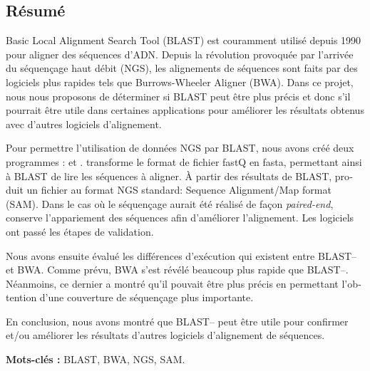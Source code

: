 \begin{otherlanguage}{french}
\chapter*{Résumé}

Basic Local Alignment Search Tool (BLAST) est couramment utilisé depuis 1990 pour aligner des séquences d'ADN.
Depuis la révolution provoquée par l'arrivée du séquençage haut débit (NGS), les alignements de séquences sont faits par des logiciels plus rapides tels que Burrows-Wheeler Aligner (BWA).
Dans ce projet, nous nous proposons de déterminer si BLAST peut être plus précis et donc s'il pourrait être utile dans certaines applications pour améliorer les résultats obtenus avec d'autres logiciels d'alignement.

Pour permettre l'utilisation de données NGS par BLAST, nous avons créé deux programmes : \fastqtofasta{} et \blastobam{}.
\fastqtofasta{} transforme le format de fichier fastQ en fasta, permettant ainsi à BLAST de lire les séquences à aligner.
À partir des résultats de BLAST, \blastobam{} produit un fichier au format NGS standard: Sequence Alignment\slash\hspace{0pt}Map format (SAM).
Dans le cas où le séquençage aurait été réalisé de façon \emph{paired-end}, \blastobam{} conserve l'appariement des séquences afin d'améliorer l'alignement.
Les logiciels ont passé les étapes de validation.

Nous avons ensuite évalué les différences d'exécution qui existent entre BLAST--\blastobam{} et BWA.
Comme prévu, BWA s'est révélé beaucoup plus rapide que BLAST--\blastobam{}.
Néanmoins, ce dernier a montré qu'il pouvait être plus précis en permettant l'obtention d'une couverture de séquençage plus importante.

En conclusion, nous avons montré que BLAST--\blastobam{} peut être utile pour confirmer et\slash\hspace{0pt}ou améliorer les résultats d'autres logiciels d'alignement de séquences.
\bigskip

\textbf{Mots-clés :} BLAST, BWA, NGS, SAM.
\end{otherlanguage}
